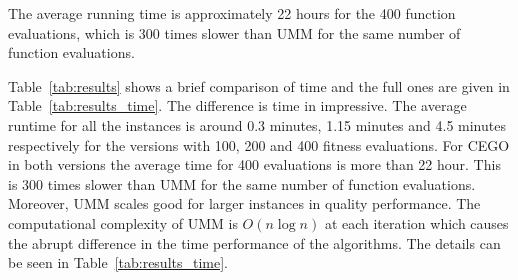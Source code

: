 \documentclass[sigconf,dvipsnames]{acmart}
\begin{document}
%
The average
running time is approximately 22 hours for the 400 function evaluations, which
is 300 times slower than UMM for the same number of function evaluations.

Table~\ref{tab:results} shows a brief comparison of time and the full ones are given in Table~\ref{tab:results_time}. The difference is time in impressive. 
The average runtime for all the instances is around 0.3 minutes, 1.15 minutes and 4.5 minutes respectively for the  versions with 100, 200 and 400 fitness evaluations. 
For CEGO in both versions the average time for 400 evaluations is more than 22 hour. This is 300 times slower than UMM for the same number of function evaluations. 
Moreover, UMM scales good for larger instances in quality performance. 
The computational complexity of UMM is $O(n \log n)$ at each iteration which causes the abrupt difference in the time performance of the algorithms. The details can be seen in Table~\ref{tab:results_time}. 




  
\end{document}
